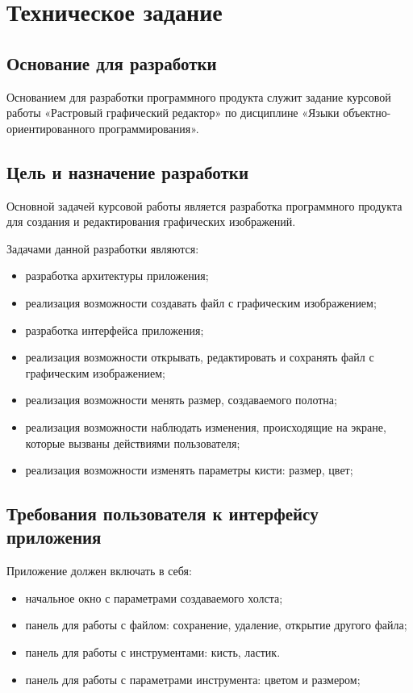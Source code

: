 \section{Техническое задание}
\subsection{Основание для разработки}

Основанием для разработки программного продукта служит задание курсовой работы «Растровый графический редактор» по дисциплине «Языки объектно-ориентированного программирования».

\subsection{Цель и назначение разработки}

Основной задачей курсовой работы является разработка программного продукта для создания и редактирования графических изображений.

Задачами данной разработки являются:
\begin{itemize}
\item разработка архитектуры приложения;
\item реализация возможности создавать файл с графическим изображением;
\item разработка интерфейса приложения;
\item реализация возможности открывать, редактировать и сохранять файл с графическим изображением;
\item реализация возможности менять размер, создаваемого полотна;
\item реализация возможности наблюдать изменения, происходящие на экране, которые вызваны действиями пользователя;
\item реализация возможности изменять параметры кисти: размер, цвет;
\end{itemize}

\subsection{Требования пользователя к интерфейсу приложения}

Приложение должен включать в себя:
\begin{itemize}
	\item начальное окно с параметрами создаваемого холста;
	\item панель для работы с файлом: сохранение, удаление, открытие другого файла;
	\item панель для работы с инструментами: кисть, ластик.
	\item панель для работы с параметрами инструмента: цветом и размером;
\end{itemize}

